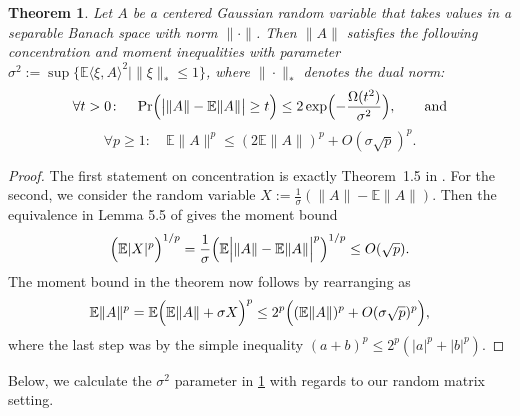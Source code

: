 \documentclass[aos]{imsart}
\newtheorem{theorem}{Theorem}[section]
\newtheorem{remark}[theorem]{Remark}
\theoremstyle{definition}
\numberwithin{equation}{section}
\DeclarePairedDelimiter{\abs}{\lvert}{\rvert}
\DeclarePairedDelimiter{\norm}{\lVert}{\rVert}
\newcommand{\E}{\mathbb{E}}
\begin{document}
\begin{appendix}
\begin{theorem}\label{thm:banach conc}
Let $A$ be a centered Gaussian random variable that takes values in a separable Banach space with norm $\|\cdot\|$.
Then $\|A\|$ satisfies the following concentration and moment inequalities with parameter $\sigma^2 := \sup \{ \E \langle \xi, A \rangle^{2} \mid \|\xi\|_{*} \leq 1 \}$, where $\|\cdot\|_{*}$ denotes the dual norm:
\[ \forall t > 0 \colon \quad \Pr\Bigl( \abs[\big]{\norm A - \E \norm A} \geq t\Bigr) \leq 2 \exp\Bigl( - \frac{\Omega(t^2)}{\sigma^{2}}\Bigr)  , \qquad \text{and}  \]
\begin{equation}\label{eq:conc via moments}
  \forall p \geq 1 \colon \quad \E \|A\|^{p} \leq (2 \E \|A\|)^{p}  + O ( \sigma \sqrt{p} )^{p}.
\end{equation}
\end{theorem}
\begin{proof}
The first statement on concentration is exactly Theorem~1.5 in \cite{P86}.
For the second, we consider the random variable $X := \frac{1}{\sigma} (\|A\| - \E \|A\| )$.
Then the equivalence in Lemma 5.5 of \cite{vershynin2010introduction} gives the moment bound
\[
  \Bigl( \E |X|^{p} \Bigr)^{1/p}
= \frac1\sigma \Big( \E \Big| \|A\| - \E \|A\| \Big|^{p} \Big)^{1/p}
 \leq O(\sqrt{p}).
\]
The moment bound in the theorem now follows by rearranging as
\[
  \E \|A\|^{p}
= \E \Bigl( \E \|A\| + \sigma X  \Bigr)^{p}
\leq 2^{p} \Bigl( (\E \|A\|)^{p} + O( \sigma \sqrt{p} )^{p} \Bigr),
\]
where the last step was by the simple inequality $(a+b)^{p} \leq 2^{p} (|a|^{p} + |b|^{p})$.
\end{proof}


Below, we calculate the $\sigma^{2}$ parameter in \cref{thm:banach conc} with regards to our random matrix setting.


\end{appendix}
\end{document}
